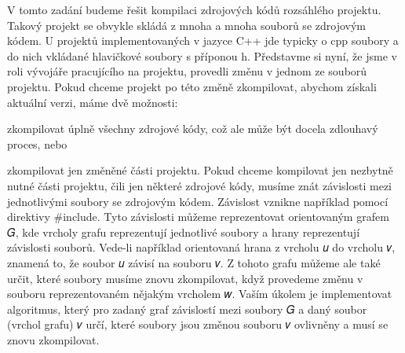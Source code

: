 V tomto zadání budeme řešit kompilaci zdrojových kódů rozsáhlého projektu. Takový projekt se obvykle skládá z mnoha a mnoha souborů se zdrojovým kódem. U projektů implementovaných v jazyce C++ jde typicky o cpp soubory a do nich vkládané hlavičkové soubory s příponou h. Představme si nyní, že jsme v roli vývojáře pracujícího na projektu, provedli změnu v jednom ze souborů projektu. Pokud chceme projekt po této změně zkompilovat, abychom získali aktuální verzi, máme dvě možnosti\+:
\begin{DoxyEnumerate}
\item zkompilovat úplně všechny zdrojové kódy, což ale může být docela zdlouhavý proces, nebo
\item zkompilovat jen změněné části projektu. Pokud chceme kompilovat jen nezbytně nutné části projektu, čili jen některé zdrojové kódy, musíme znát závislosti mezi jednotlivými soubory se zdrojovým kódem. Závislost vznikne například pomocí direktivy \#include. Tyto závislosti můžeme reprezentovat orientovaným grafem 𝐺, kde vrcholy grafu reprezentují jednotlivé soubory a hrany reprezentují závislosti souborů. Vede-\/li například orientovaná hrana z vrcholu 𝑢 do vrcholu 𝑣, znamená to, že soubor 𝑢 závisí na souboru 𝑣. Z tohoto grafu můžeme ale také určit, které soubory musíme znovu zkompilovat, když provedeme změnu v souboru reprezentovaném nějakým vrcholem 𝑤. Vaším úkolem je implementovat algoritmus, který pro zadaný graf závislostí mezi soubory 𝐺 a daný soubor (vrchol grafu) 𝑣 určí, které soubory jsou změnou souboru 𝑣 ovlivněny a musí se znovu zkompilovat. 
\end{DoxyEnumerate}